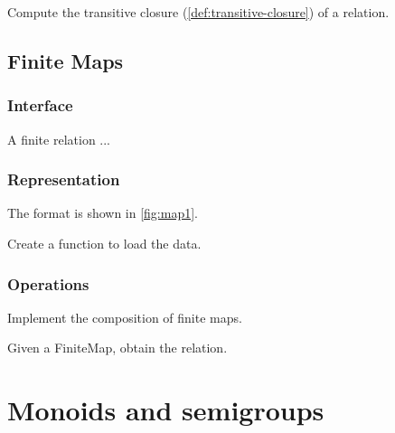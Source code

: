 \begin{exercise}
Compute the transitive closure (\cref{def:transitive-closure}) of a relation.


\end{exercise}


\section{Finite Maps}

\subsection*{Interface}

A finite relation  ...


\subsection*{Representation}

The format is shown in \cref{fig:map1}.


\begin{exercise}[Representation]
Create a function to load the data.


%

\end{exercise}

\subsection{Operations}


\begin{exercise}[Composition]
Implement the composition of finite maps.


%

\end{exercise}


\begin{exercise}
Given a FiniteMap, obtain the relation.


%

\end{exercise}


\chapter{Monoids and semigroups}


